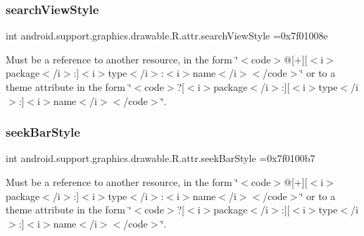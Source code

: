 \subsubsection{\texorpdfstring{search\+View\+Style}{searchViewStyle}}
{\footnotesize\ttfamily int android.\+support.\+graphics.\+drawable.\+R.\+attr.\+search\+View\+Style =0x7f01008e\hspace{0.3cm}{\ttfamily [static]}}

Must be a reference to another resource, in the form \char`\"{}$<$code$>$@\mbox{[}+\mbox{]}\mbox{[}$<$i$>$package$<$/i$>$\+:\mbox{]}$<$i$>$type$<$/i$>$\+:$<$i$>$name$<$/i$>$$<$/code$>$\char`\"{} or to a theme attribute in the form \char`\"{}$<$code$>$?\mbox{[}$<$i$>$package$<$/i$>$\+:\mbox{]}\mbox{[}$<$i$>$type$<$/i$>$\+:\mbox{]}$<$i$>$name$<$/i$>$$<$/code$>$\char`\"{}. \mbox{\label{classandroid_1_1support_1_1graphics_1_1drawable_1_1R_1_1attr_a460851de45b3a676c01374535644ce2b}} 
\subsubsection{\texorpdfstring{seek\+Bar\+Style}{seekBarStyle}}
{\footnotesize\ttfamily int android.\+support.\+graphics.\+drawable.\+R.\+attr.\+seek\+Bar\+Style =0x7f0100b7\hspace{0.3cm}{\ttfamily [static]}}

Must be a reference to another resource, in the form \char`\"{}$<$code$>$@\mbox{[}+\mbox{]}\mbox{[}$<$i$>$package$<$/i$>$\+:\mbox{]}$<$i$>$type$<$/i$>$\+:$<$i$>$name$<$/i$>$$<$/code$>$\char`\"{} or to a theme attribute in the form \char`\"{}$<$code$>$?\mbox{[}$<$i$>$package$<$/i$>$\+:\mbox{]}\mbox{[}$<$i$>$type$<$/i$>$\+:\mbox{]}$<$i$>$name$<$/i$>$$<$/code$>$\char`\"{}. \mbox{\label{classandroid_1_1support_1_1graphics_1_1drawable_1_1R_1_1attr_a04a5ca77af49b575c68c894e524bf504}} 
